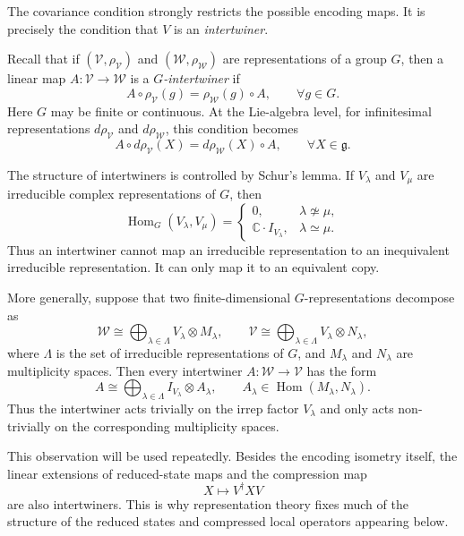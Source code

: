 \documentclass[10pt,twocolumn,superscriptaddress,aps,amsmath,amssymb,citeautoscript,floatfix,prx,longbibliography]{revtex4-2}
\newcounter{alg}
\theoremstyle{plain}
\theoremstyle{plain}
\theoremstyle{plain}
\theoremstyle{plain}
\theoremstyle{plain}
\theoremstyle{plain}
\begin{document}
The covariance condition strongly restricts the possible encoding maps. It is precisely the condition that $V$ is an \textit{intertwiner}. 

Recall that if $(\mathcal V,\rho_{\mathcal V})$ and $(\mathcal W,\rho_{\mathcal W})$ are representations of a group $G$, then a linear map $A:\mathcal V\to\mathcal W$ is a \textit{$G$-intertwiner} if
\begin{equation}\label{eq:intertwiner_def}
    A\circ\rho_{\mathcal V}(g)
    =
    \rho_{\mathcal W}(g)\circ A,
    \qquad
    \forall g\in G .
\end{equation}
Here $G$ may be finite or continuous. At the Lie-algebra level, for infinitesimal representations $d\rho_{\mathcal V}$ and $d\rho_{\mathcal W}$, this condition becomes
$$
    A\circ d\rho_{\mathcal V}(X)
    =
    d\rho_{\mathcal W}(X)\circ A,
    \qquad
    \forall X\in\mathfrak g .
$$

The structure of intertwiners is controlled by Schur's lemma. If $V_\lambda$ and $V_\mu$ are irreducible complex representations of $G$, then
$$
    \operatorname{Hom}_G(V_\lambda,V_\mu)
    =
    \begin{cases}
        0, & \lambda\not\simeq\mu,\\
        \mathbb C\cdot I_{V_\lambda}, & \lambda\simeq\mu .
    \end{cases}
$$
Thus an intertwiner cannot map an irreducible representation to an inequivalent irreducible representation. It can only map it to an equivalent copy.

More generally, suppose that two finite-dimensional $G$-representations decompose as
$$
    \mathcal W
    \cong
    \bigoplus_{\lambda\in\Lambda}
    V_\lambda\otimes M_\lambda,
    \qquad
    \mathcal V
    \cong
    \bigoplus_{\lambda\in\Lambda}
    V_\lambda\otimes N_\lambda,
$$
where $\Lambda$ is the set of irreducible representations of $G$, and $M_\lambda$ and $N_\lambda$ are multiplicity spaces. Then every intertwiner $A:\mathcal W\to\mathcal V$ has the form
\begin{equation}\label{eq:intertwiner_decomp}
    A
    \cong
    \bigoplus_{\lambda\in\Lambda}
    I_{V_\lambda}\otimes A_\lambda,
    \qquad
    A_\lambda\in\operatorname{Hom}(M_\lambda,N_\lambda).
\end{equation}
Thus the intertwiner acts trivially on the irrep factor $V_\lambda$ and only acts non-trivially on the corresponding multiplicity spaces.

This observation will be used repeatedly. Besides the encoding isometry itself, the linear extensions of reduced-state maps and the compression map
$$
    X
    \longmapsto
    V^\dagger X V
$$
are also intertwiners. This is why representation theory fixes much of the structure of the reduced states and compressed local operators appearing below.
\end{document}

